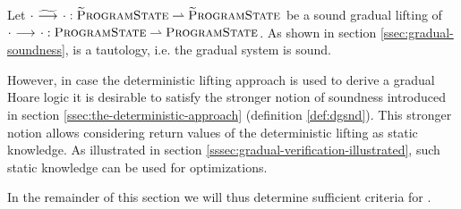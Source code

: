 Let ${\cdot} \,\,{\widetilde{\longrightarrow}^{}}\,\, {\cdot} : \textup{\textsc{\ensuremath{\widetilde{\text{P}}}rogramState}} \rightharpoonup \textup{\textsc{\ensuremath{\widetilde{\text{P}}}rogramState}}$ be a sound gradual lifting of ${\cdot} \,\,{\longrightarrow^{}}\,\, {\cdot} : \textup{\textsc{ProgramState}} \rightharpoonup \textup{\textsc{ProgramState}}$.
As shown in section \ref{ssec:gradual-soundness},  is a tautology, i.e. the gradual system is sound.

\begin{comment}
TODO when progress definition is final
Progress: Note that premise is tautology.
So we artificially make conclusion true by demanding that lifting is total.
This always works since the lifting can be defined arbitrarily wherever the original function is undefined.
\end{comment}


However, in case the deterministic lifting approach is used to derive a gradual Hoare logic it is desirable to satisfy the stronger notion of soundness introduced in section \ref{ssec:the-deterministic-approach} (definition \ref{def:dgsnd}).
This stronger notion allows considering return values of the deterministic lifting as static knowledge.
As illustrated in section \ref{sssec:gradual-verification-illustrated}, such static knowledge can be used for optimizations.

In the remainder of this section we will thus determine sufficient criteria for .


\begin{comment}

Running example:
$$\dgthoare{~}{\qm}{\sAssert{\phiEq{x}{3}}}{\withqmGen{\phiEq{x}{3}}}$$
holds but not
$$\gtHoare{~}{\qm}{\sAssert{\phiEq{x}{3}}}{\withqmGen{\phiEq{x}{3}}}$$

So far, our definition of $\gsssem$ as a total lifting of $\sssem$ may be to weak, breaking the subset relationship:
\begin{description}
    \item[$\sssem$ too weak]
    It is possible that the dynamic semantics of \svl defines
    $$\sssem^{\sAssert{\phiEq{x}{3}}}(\pi_{\phiEq{x}{4}}) = \pi'_{\phiEq{x}{4}}$$
    This is not unreasonable, since this function is guaranteed to be only called with “valid” program states in the static system!
    An additional runtime check would be overhead.
    
    \item[$\gsssem$ too weak]
    If $\sssem^{\sAssert{\phiEq{x}{3}}}(\pi_{\phiEq{x}{4}})$ is undefined due to runtime checks.
    Yet, the lifting is supposed to be total, so passing along the program state unchecked is again a valid realization:
    $$\gsssem^{\sAssert{\phiEq{x}{3}}}(\pi_{\phiEq{x}{4}}) = \pi'_{\phiEq{x}{4}}$$
    Mapping to an exception would have been better in this case.
\end{description}
Note that both problems are unrelated to optimality of the lifting.

\end{comment}

